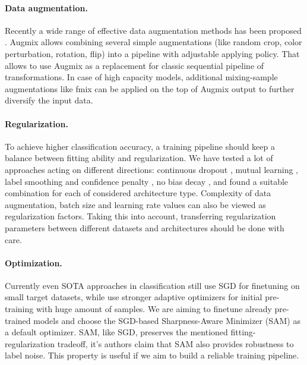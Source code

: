 \documentclass[runningheads]{llncs}
\begin{document}
\paragraph{Data augmentation.}
Recently a wide range of effective data augmentation methods has been proposed \cite{Naveed2021SurveyIM, Harris2020FMixEM}.
Augmix \cite{hendrycks2020augmix} allows combining several
simple augmentations (like random crop, color perturbation, rotation, flip) into a pipeline
with adjustable applying policy. That allows to use Augmix as a replacement for classic sequential pipeline of transformations.
In case of high capacity models, additional mixing-sample augmentations like fmix \cite{Harris2020FMixEM} can be applied on the top of Augmix output
to further diversify the input data.

\paragraph{Regularization.}
To achieve higher classification accuracy, a training pipeline should keep a balance between
fitting ability and regularization. We have tested a lot of approaches
acting on different directions: continuous dropout \cite{Shen2018ContinuousD}, mutual learning \cite{Zhang2018DeepML},
label smoothing and confidence penalty \cite{Pereyra2017RegularizingNN}, no bias decay \cite{bagOfTricks},
and found a suitable combination for each of considered architecture type.
Complexity of data augmentation, batch size and learning rate values can also be viewed as regularization factors.
Taking this into account, transferring regularization parameters between different datasets and architectures
should be done with care.

\paragraph{Optimization.}
Currently even SOTA approaches in classification still use SGD
\cite{Zhai2021ScalingVT, Pham2020MetaPL} for finetuning on small target datasets,
while use stronger adaptive optimizers \cite{Loshchilov2019DecoupledWD, Zeiler2012ADADELTAAA}
for initial pre-training with huge amount of samples. We are aiming to finetune already pre-trained models
and choose the SGD-based Sharpness-Aware Minimizer (SAM) \cite{Foret2020SharpnessAwareMF} as a default optimizer.
SAM, like SGD, preserves the mentioned fitting-regularization tradeoff, it's authors claim that SAM also
provides robustness to label noise. This property is useful if we aim to build a reliable training pipeline.
\end{document}
